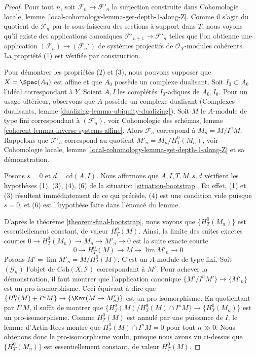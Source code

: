 \begin{proof}
Pour tout $n$, soit $\mathcal{F}_n \to \mathcal{F}'_n$ la surjection
construite dans
Cohomologie locale, lemme \ref{local-cohomology-lemma-get-depth-1-along-Z}.
Comme il s'agit du quotient de $\mathcal{F}_n$ par le sous-faisceau
des sections à support dans $T$, nous voyons qu'il existe des applications canoniques
$\mathcal{F}'_{n + 1} \to \mathcal{F}'_n$ telles que l'on obtienne
une application $(\mathcal{F}_n) \to (\mathcal{F}_n')$
de systèmes projectifs de $\mathcal{O}_X$-modules cohérents.
La propriété (1) est vérifiée par construction.

\medskip\noindent
Pour démontrer les propriétés (2) et (3), nous pouvons supposer que $X = \Spec(A_0)$ est
affine et que $A_0$ possède un complexe dualisant. Soit $I_0 \subset A_0$ l'idéal
correspondant à $Y$. Soient $A, I$ les complétés $I_0$-adiques de
$A_0, I_0$. Pour un usage ultérieur, observons que $A$ possède un complexe dualisant
(Complexes dualisants, lemme \ref{dualizing-lemma-ubiquity-dualizing}).
Soit $M$ le $A$-module de type fini correspondant à $(\mathcal{F}_n)$, voir
Cohomologie des schémas, lemme \ref{coherent-lemma-inverse-systems-affine}.
Alors $\mathcal{F}_n$ correspond à $M_n = M/I^nM$. Rappelons que
$\mathcal{F}'_n$ correspond au quotient $M'_n = M_n / H^0_T(M_n)$,
voir Cohomologie locale, lemme \ref{local-cohomology-lemma-get-depth-1-along-Z}
et sa démonstration.

\medskip\noindent
Posons $s = 0$ et $d = \text{cd}(A, I)$.
Nous affirmons que $A, I, T, M, s, d$ vérifient les hypothèses (1), (3), (4), (6)
de la situation \ref{situation-bootstrap}.
En effet, (1) et (3) résultent immédiatement de ce qui précède, (4) est
une condition vide puisque $s = 0$, et (6) est l'hypothèse
faite dans l'énoncé du lemme.

\medskip\noindent
D'après le théorème \ref{theorem-final-bootstrap}, nous voyons que $\{H^0_T(M_n)\}$
est essentiellement constant, de valeur $H^0_T(M)$. Ainsi, la limite des
suites exactes courtes $0 \to H^0_T(M_n) \to M_n \to M'_n \to 0$
est la suite exacte courte
$$
0 \to H^0_T(M) \to M \to \lim M'_n \to 0
$$
Posons $M' = \lim M'_n = M/H^0_T(M)$. C'est un $A$-module de type fini.
Soit $(\mathcal{G}_n)$ l'objet de $\textit{Coh}(X, \mathcal{I})$
correspondant à $M'$. Pour achever la démonstration, il faut montrer que l'application
canonique $\{M'/I^nM'\} \to \{M'_n\}$ est un pro-isomorphisme.
Ceci équivaut à dire que
$\{H^0_T(M) + I^nM\} \to \{\Ker(M \to M'_n)\}$ est un
pro-isomorphisme. En quotientant par $I^nM$, il suffit de montrer que
$\{H^0_T(M)/H^0_T(M) \cap I^nM\} \to \{H^0_T(M_n)\}$
est un pro-isomorphisme. Comme $H^0_T(M)$ est annulé par une puissance
de $I$, le lemme d'Artin-Rees montre que $H^0_T(M) \cap I^nM = 0$
pour tout $n \gg 0$. Nous obtenons donc le pro-isomorphisme voulu,
puisque nous avons vu ci-dessus que $\{H^0_T(M_n)\}$
est essentiellement constant, de valeur $H^0_T(M)$.
\end{proof}

